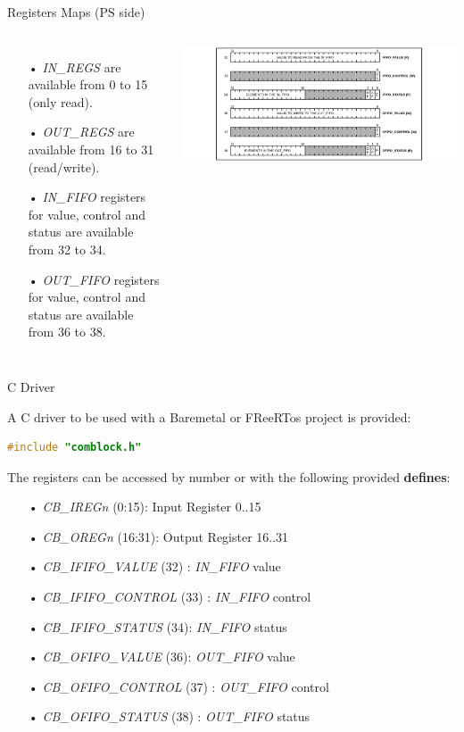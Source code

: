 \documentclass[aspectratio=169]{beamer}
\begin{document}
\begin{frame}{Registers Maps (PS side)}
  \begin{columns}
      \begin{itemize}
        \scriptsize
        \item[•] \textit{IN\_REGS} are available from 0 to 15 (only read).
        \item[•] \textit{OUT\_REGS} are available from 16 to 31 (read/write).
        \item[•] \textit{IN\_FIFO} registers for value, control and status are available from 32 to 34.
        \item[•] \textit{OUT\_FIFO} registers for value, control and status are available from 36 to 38.
      \end{itemize}
      \center
      \includegraphics[width=1.0\textwidth, trim={2cm 0 2cm 0}, clip]{../images/fifo_regs.png}
  \end{columns}
\end{frame}

\begin{frame}[fragile]{C Driver}

  A C driver to be used with a Baremetal or FReeRTos project is provided:
  \begin{lstlisting}[language=C, numbers=none, basicstyle=\scriptsize]
#include "comblock.h"
  \end{lstlisting}

  The registers can be accessed by number or with the following provided \textbf{defines}:
  \begin{itemize}
    \scriptsize
    \item[•] \textit{CB\_IREGn} (0:15): Input Register 0..15
    \item[•] \textit{CB\_OREGn} (16:31): Output Register 16..31
    \item[•] \textit{CB\_IFIFO\_VALUE} (32) : \textit{IN\_FIFO} value
    \item[•] \textit{CB\_IFIFO\_CONTROL} (33) : \textit{IN\_FIFO} control
    \item[•] \textit{CB\_IFIFO\_STATUS} (34): \textit{IN\_FIFO} status
    \item[•] \textit{CB\_OFIFO\_VALUE} (36): \textit{OUT\_FIFO} value
    \item[•] \textit{CB\_OFIFO\_CONTROL} (37) : \textit{OUT\_FIFO} control
    \item[•] \textit{CB\_OFIFO\_STATUS} (38) : \textit{OUT\_FIFO} status
  \end{itemize}
\end{frame}
\end{document}
